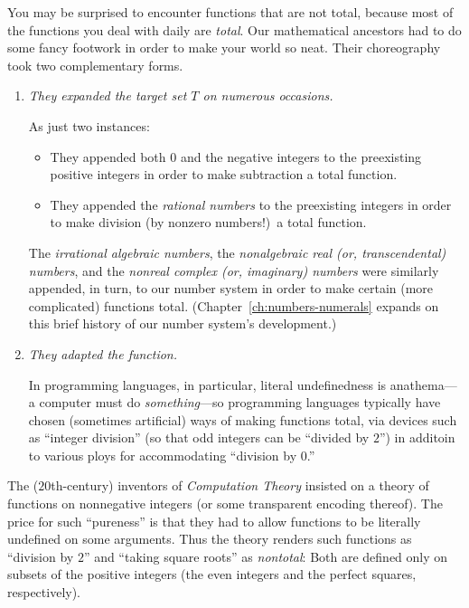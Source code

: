 
\medskip

You may be surprised to encounter functions that are not total, because most of the functions you deal with daily are {\em total}.  Our mathematical ancestors had to do some fancy footwork in order to make your world so neat.  Their choreography took two complementary forms.
\begin{enumerate}
\item
{\em They expanded the target set $T$ on numerous occasions.}

\smallskip

As just two instances:
  \begin{itemize}
  \item
They appended both $0$ and the negative integers to the preexisting positive integers in order to make subtraction a total function.

  \medskip\item
They appended the {\it rational numbers} to the preexisting integers in order to make division (by nonzero numbers!)~a total function.
  \end{itemize}
The {\it irrational algebraic numbers}, the {\it nonalgebraic real (or, transcendental) numbers}, and the {\it nonreal complex (or, imaginary) numbers} were similarly appended, in turn, to our number system in order to make certain (more complicated) functions total.  (Chapter~\ref{ch:numbers-numerals} expands on this brief history of our number system's development.)

\medskip\item
{\em They adapted the function.}

\smallskip

In programming languages, in particular, literal undefinedness is anathema---a computer must do {\em something}---so programming languages typically have chosen (sometimes artificial) ways of making functions total, via devices such as ``integer division'' (so that odd integers can be ``divided by $2$'') in additoin to various ploys for accommodating ``division by $0$.''
\end{enumerate}
The ($20$th-century) inventors of {\em Computation Theory} insisted on a theory of functions on nonnegative integers (or some transparent encoding thereof).  The price for such ``pureness'' is that they had to allow functions to be literally undefined on some arguments.  Thus the theory renders such functions as ``division by $2$'' and ``taking square roots'' as {\em nontotal}: Both are defined only on subsets of the positive integers (the even integers and the perfect squares, respectively).

